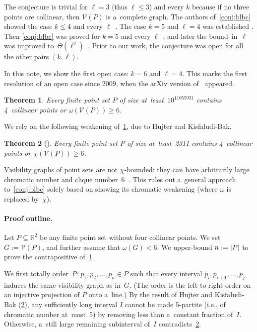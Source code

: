 \documentclass[11pt,a4paper]{article}
\newtheorem{theorem}{Theorem}
\newcommand{\real}{\mathbb{R}}
\newcommand{\vis}{\mathcal V}
\begin{document}
The conjecture is trivial for $\ell=3$ (thus $\ell \leqslant 3$) and every $k$ because if no three points are collinear, then $\vis(P)$ is a~complete graph.
The authors of~\cref{conj:blbc} showed the case $k \leqslant 4$ and every $\ell$~\cite{Kara05}.
The case $k = 5$ and $\ell=4$ was established \cite{Addario07}.
Then \cref{conj:blbc} was proved for $k = 5$ and every $\ell$~\cite{Abel11}, and later the bound~in~$\ell$ was improved to~$\Theta(\ell^2)$~\cite{Barat15}.
Prior to our work, the conjecture was open for all the other pairs $(k, \ell)$.

\medskip
In this note, we show the first open case: $k=6$ and $\ell=4$.
This marks the first resolution of an open case since 2009, when the arXiv version of~\cite{Abel11} appeared.

\begin{theorem}\label{thm:main}
Every finite point set $P$ of size at~least~$10^{11055931}$ contains 4~collinear points or $\omega(\vis(P)) \geqslant 6$. 
\end{theorem}

We rely on the following weakening of~\cref{thm:main}, due to Hujter and Kisfaludi-Bak.

\begin{theorem}[\cite{Hujter14}]\label{thm:hkb}
 Every finite point set $P$ of size at~least~2311 contains 4~collinear points or $\chi(\vis(P)) \geqslant 6$.
\end{theorem}

Visibility graphs of point sets are not $\chi$-bounded: they can have arbitrarily large chromatic number and clique number~6~\cite{Pfender08}.
This rules out a~general approach to~\cref{conj:blbc} solely based on showing its chromatic weakening (where $\omega$ is replaced by~$\chi$).

\paragraph*{Proof outline.}
Let $P \subseteq \real^2$ be any finite point set without four collinear points.
We set $G := \vis(P)$, and further assume that $\omega(G) < 6$.
We upper-bound $n := \mathopen| P \mathclose|$ to prove the contrapositive of~\cref{thm:main}.

We first totally order~$P$: $p_1, p_2, \ldots, p_n \in P$ such that every interval $p_i, p_{i+1}, \ldots, p_j$ induces the same visibility graph as in~$G$.
(The order is the left-to-right order on an injective projection of $P$ onto a~line.) 
By the result of Hujter and Kisfaludi-Bak (\cref{thm:hkb}), any sufficiently long interval $I$ cannot be made 5-partite (i.e., of chromatic number at~most~5) by removing less than a~constant fraction of~$I$.
Otherwise, a~still large remaining subinterval of~$I$ contradicts~\cref{thm:hkb}.
\end{document}
